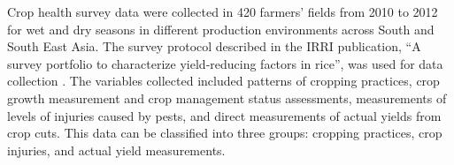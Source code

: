 Crop health survey data were collected in 420 farmers' fields from 2010 to 2012 for wet and dry seasons in different production environments across South and South East Asia. The survey protocol described in the IRRI publication, ``A survey portfolio to characterize yield-reducing factors in rice'', was used for data collection \citep{Savarysurvey2009}. The variables collected included patterns of cropping practices, crop growth measurement and crop management status assessments, measurements of levels of injuries caused by pests, and direct measurements of actual yields from crop cuts. This data can be classified into three groups: cropping practices, crop injuries, and actual yield measurements.